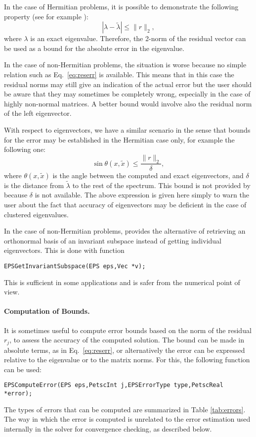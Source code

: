 	In the case of Hermitian problems, it is possible to demonstrate the following property (see for example \citep[ch. 3]{Saad:1992:NML}):
\begin{equation}\label{eq:reserr}
|\lambda-\tilde{\lambda}|\leq \|r\|_2,
\end{equation}
where $\lambda$ is an exact eigenvalue. Therefore, the 2-norm of the residual vector can be used as a bound for the absolute error in the eigenvalue.

	In the case of non-Hermitian problems, the situation is worse because no simple relation such as Eq.\ \ref{eq:reserr} is available. This means that in this case the residual norms may still give an indication of the actual error but the user should be aware that they may sometimes be completely wrong, especially in the case of highly non-normal matrices. A better bound would involve also the residual norm of the left eigenvector.

	With respect to eigenvectors, we have a similar scenario in the sense that bounds for the error may be established in the Hermitian case only, for example the following one:
\begin{equation}
\sin \theta(x,\tilde{x})\leq \frac{\|r\|_2}{\delta},
\end{equation}
where $\theta(x,\tilde{x})$ is the angle between the computed and exact eigenvectors, and $\delta$ is the distance from $\tilde{\lambda}$ to the rest of the spectrum. This bound is not provided by \slepc because $\delta$ is not available. The above expression is given here simply to warn the user about the fact that accuracy of eigenvectors may be deficient in the case of clustered eigenvalues.

	In the case of non-Hermitian problems, \slepc provides the alternative of retrieving an orthonormal basis of an invariant subspace instead of getting individual eigenvectors. This is done with function
	\begin{Verbatim}[fontsize=\small]
	EPSGetInvariantSubspace(EPS eps,Vec *v);
	\end{Verbatim}
This is sufficient in some applications and is safer from the numerical point of view.

\paragraph{Computation of Bounds.}
It is sometimes useful to compute error bounds based on the norm of the residual $r_j$, to assess the accuracy of the computed solution. The bound can be made in absolute terms, as in Eq.\ \ref{eq:reserr}, or alternatively the error can be expressed relative to the eigenvalue or to the matrix norms. For this, the following function can be used:
	\begin{Verbatim}[fontsize=\small]
	EPSComputeError(EPS eps,PetscInt j,EPSErrorType type,PetscReal *error);
	\end{Verbatim}
The types of errors that can be computed are summarized in Table \ref{tab:errors}.
The way in which the error is computed is unrelated to the error estimation used internally in the solver for convergence checking, as described below.

